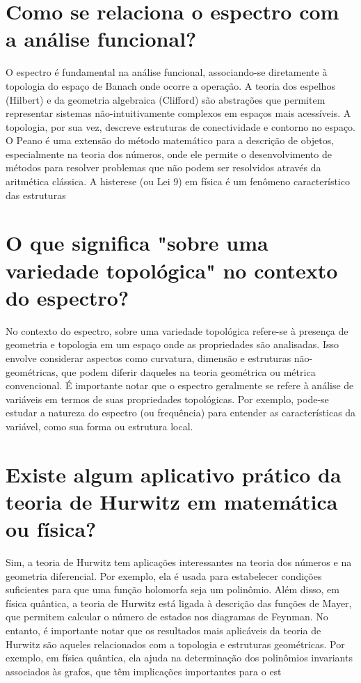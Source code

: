 \documentclass[11pt,a4paper]{article}
\begin{document}
\section{Como se relaciona o espectro com a análise funcional?}
O espectro é fundamental na análise funcional, associando-se diretamente à topologia do espaço de Banach onde ocorre a operação. A teoria dos espelhos (Hilbert) e da geometria algebraica (Clifford) são abstrações que permitem representar sistemas não-intuitivamente complexos em espaços mais acessíveis. A topologia, por sua vez, descreve estruturas de conectividade e contorno no espaço. O Peano é uma extensão do método matemático para a descrição de objetos, especialmente na teoria dos números, onde ele permite o desenvolvimento de métodos para resolver problemas que não podem ser resolvidos através da aritmética clássica. A histerese (ou Lei 9) em física é um fenômeno característico das estruturas

\section{O que significa "sobre uma variedade topológica" no contexto do espectro?}
No contexto do espectro, sobre uma variedade topológica refere-se à presença de geometria e topologia em um espaço onde as propriedades são analisadas. Isso envolve considerar aspectos como curvatura, dimensão e estruturas não-geométricas, que podem diferir daqueles na teoria geométrica ou métrica convencional. É importante notar que o espectro geralmente se refere à análise de variáveis em termos de suas propriedades topológicas. Por exemplo, pode-se estudar a natureza do espectro (ou frequência) para entender as características da variável, como sua forma ou estrutura local.

\section{Existe algum aplicativo prático da teoria de Hurwitz em matemática ou física?}
Sim, a teoria de Hurwitz tem aplicações interessantes na teoria dos números e na geometria diferencial. Por exemplo, ela é usada para estabelecer condições suficientes para que uma função holomorfa seja um polinômio. Além disso, em física quântica, a teoria de Hurwitz está ligada à descrição das funções de Mayer, que permitem calcular o número de estados nos diagramas de Feynman. No entanto, é importante notar que os resultados mais aplicáveis da teoria de Hurwitz são aqueles relacionados com a topologia e estruturas geométricas. Por exemplo, em física quântica, ela ajuda na determinação dos polinômios invariants associados às grafos, que têm implicações importantes para o est
\end{document}
